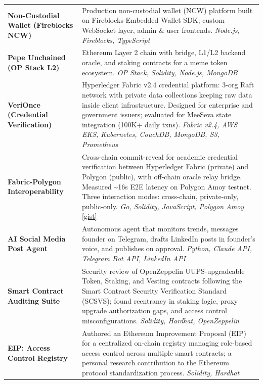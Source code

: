 \documentclass[11pt, a4paper]{article}
\begin{document}
\noindent
\begin{tabularx}{\linewidth}{@{}l X@{}}
\textbf{Non-Custodial Wallet (Fireblocks NCW)} &
  Production non-custodial wallet (NCW) platform built on Fireblocks Embedded Wallet SDK; custom WebSocket layer, admin \& user frontends. \textit{Node.js, Fireblocks, TypeScript}\\[4pt]

\textbf{Pepe Unchained (OP Stack L2)} &
  Ethereum Layer 2 chain with bridge, L1/L2 backend oracle, and staking contracts for a meme token ecosystem. \textit{OP Stack, Solidity, Node.js, MongoDB}\\[4pt]

\textbf{VeriOnce (Credential Verification)} &
  Hyperledger Fabric v2.4 credential platform: 3-org Raft network with private data collections keeping raw data inside client infrastructure. Designed for enterprise and government issuers; evaluated for MeeSeva state integration (100K+ daily txns). \textit{Fabric v2.4, AWS EKS, Kubernetes, CouchDB, MongoDB, S3, Prometheus}\\[4pt]

\textbf{Fabric-Polygon Interoperability} &
  Cross-chain commit-reveal for academic credential verification between Hyperledger Fabric (private) and Polygon (public), with off-chain oracle relay bridge. Measured \textasciitilde{}16s E2E latency on Polygon Amoy testnet. Three interaction modes: cross-chain, private-only, public-only. \textit{Go, Solidity, JavaScript, Polygon Amoy}
  \href{https://gist.github.com/bankerneel/df6fd079c8c8c21c57e8778dbb5d0936}{\small[gist]}\\[4pt]

\textbf{AI Social Media Post Agent} &
  Autonomous agent that monitors trends, messages founder on Telegram, drafts LinkedIn posts in founder's voice, and publishes on approval. \textit{Python, Claude API, Telegram Bot API, LinkedIn API}\\[4pt]

\textbf{Smart Contract Auditing Suite} &
  Security review of OpenZeppelin UUPS-upgradeable Token, Staking, and Vesting contracts following the Smart Contract Security Verification Standard (SCSVS); found reentrancy in staking logic, proxy upgrade authorization gaps, and access control misconfigurations. \textit{Solidity, Hardhat, OpenZeppelin}\\[4pt]

\textbf{EIP: Access Control Registry} &
  Authored an Ethereum Improvement Proposal (EIP) for a centralized on-chain registry managing role-based access control across multiple smart contracts; a personal research contribution to the Ethereum protocol standardization process. \textit{Solidity, Hardhat}\\
\end{tabularx}
\end{document}
